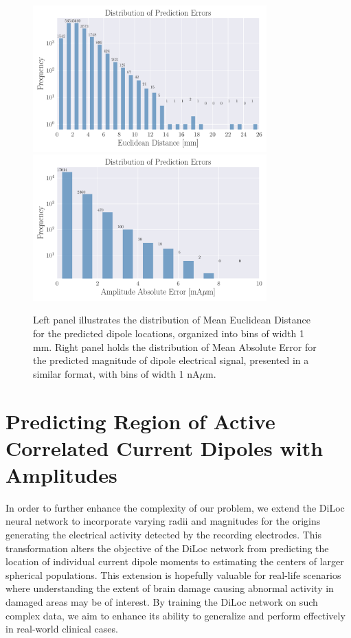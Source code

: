 \documentclass[a4paper, UKenglish, 11pt]{uiomaster}
\begin{document}
\begin{figure}
  \hspace*{-2cm} %
  \includegraphics[width=9cm]{figures/new_histogram_position_amplitude.pdf}
  \includegraphics[width=9cm]{figures/new_histogram_amplitude_amplitude.pdf}
  \caption{Left panel illustrates the distribution of Mean Euclidean Distance for the predicted dipole locations, organized into bins of width 1 mm. Right panel holds the distribution of Mean Absolute Error for the predicted magnitude of dipole electrical signal, presented in a similar format, with bins of width 1 nA$\mu$m.}
  \label{fig:histogram_magnitude}
\end{figure}










\section{Predicting Region of Active Correlated Current Dipoles with Amplitudes}

In order to further enhance the complexity of our problem, we extend the DiLoc neural network to incorporate varying radii and magnitudes for the origins generating the electrical activity detected by the recording electrodes. This transformation alters the objective of the DiLoc network from predicting the location of individual current dipole moments to estimating the centers of larger spherical populations. This extension is hopefully valuable for real-life scenarios where understanding the extent of brain damage causing abnormal activity in damaged areas may be of interest. By training the DiLoc network on such complex data, we aim to enhance its ability to generalize and perform effectively in real-world clinical cases.
\end{document}
